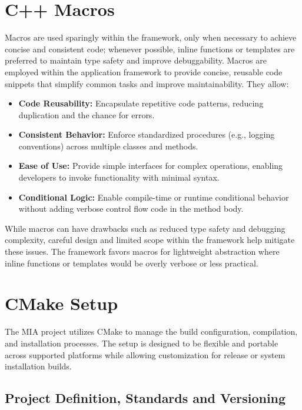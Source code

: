 \section{C++ Macros}\label{sec:cpp_macros}
Macros are used sparingly within the framework, only when necessary to achieve concise and consistent code; whenever possible, inline functions or templates are preferred to maintain type safety and improve debuggability. Macros are employed within the application framework to provide concise, reusable code snippets that simplify common tasks and improve maintainability. They allow:
\begin{itemize}
    \item \textbf{Code Reusability:} Encapsulate repetitive code patterns, reducing duplication and the chance for errors.
    \item \textbf{Consistent Behavior:} Enforce standardized procedures (e.g., logging conventions) across multiple classes and methods.
    \item \textbf{Ease of Use:} Provide simple interfaces for complex operations, enabling developers to invoke functionality with minimal syntax.
    \item \textbf{Conditional Logic:} Enable compile-time or runtime conditional behavior without adding verbose control flow code in the method body.
\end{itemize}
While macros can have drawbacks such as reduced type safety and debugging complexity, careful design and limited scope within the framework help mitigate these issues. The framework favors macros for lightweight abstraction where inline functions or templates would be overly verbose or less practical.











\section{CMake Setup}
\label{sec:CMake-setup}

The MIA project utilizes CMake to manage the build configuration, compilation, and installation processes. The setup is designed to be flexible and portable across supported platforms while allowing customization for release or system installation builds.

\subsection{Project Definition, Standards and Versioning}

